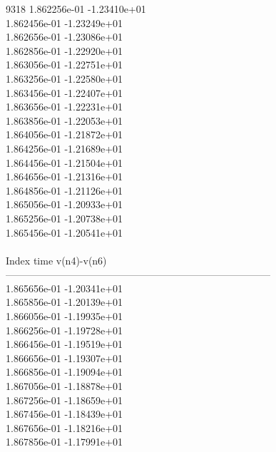 9318	1.862256e-01	-1.23410e+01	\\ 	1.862456e-01	-1.23249e+01	\\ 	1.862656e-01	-1.23086e+01	\\ 	1.862856e-01	-1.22920e+01	\\ 	1.863056e-01	-1.22751e+01	\\ 	1.863256e-01	-1.22580e+01	\\ 	1.863456e-01	-1.22407e+01	\\ 	1.863656e-01	-1.22231e+01	\\ 	1.863856e-01	-1.22053e+01	\\ 	1.864056e-01	-1.21872e+01	\\ 	1.864256e-01	-1.21689e+01	\\ 	1.864456e-01	-1.21504e+01	\\ 	1.864656e-01	-1.21316e+01	\\ 	1.864856e-01	-1.21126e+01	\\ 	1.865056e-01	-1.20933e+01	\\ 	1.865256e-01	-1.20738e+01	\\ 	1.865456e-01	-1.20541e+01	\\ \hline
\\ \hline
Index   time            v(n4)-v(n6)     \\ \hline
--------------------------------------------------------------------------------\\ 	1.865656e-01	-1.20341e+01	\\ 	1.865856e-01	-1.20139e+01	\\ 	1.866056e-01	-1.19935e+01	\\ 	1.866256e-01	-1.19728e+01	\\ 	1.866456e-01	-1.19519e+01	\\ 	1.866656e-01	-1.19307e+01	\\ 	1.866856e-01	-1.19094e+01	\\ 	1.867056e-01	-1.18878e+01	\\ 	1.867256e-01	-1.18659e+01	\\ 	1.867456e-01	-1.18439e+01	\\ 	1.867656e-01	-1.18216e+01	\\ 	1.867856e-01	-1.17991e+01	\\ \hline

